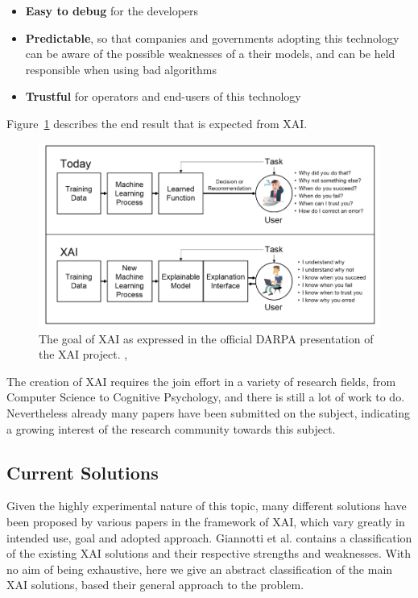 \documentclass[conference]{IEEEtran}
\newcommand{\cit}[1][]{\todo[tickmarkheight=0.2cm]{cit #1}}
\begin{document}
\begin{itemize}
    \item \textbf{Easy to debug} for the developers
    \item \textbf{Predictable}, so that companies and governments adopting this
          technology can be aware of the possible weaknesses of a their models,
          and can be held responsible when using bad algorithms
    \item \textbf{Trustful} for operators and end-users of this technology
\end{itemize}

Figure~\ref{fig:xai} describes the end result that is expected from XAI.


\begin{figure}[h!] \includegraphics[width=\linewidth]{images/xai.png}
    \caption{The goal of XAI as expressed in the official DARPA presentation of the XAI project. ,} \label{fig:xai} \end{figure}

The creation of XAI requires the join effort in a variety of research fields,
from Computer Science to Cognitive Psychology, and there is still a lot of work
to do. Nevertheless already many papers have been submitted on the subject,
indicating a growing interest of the research community towards this subject.

\subsection{Current Solutions}
\label{sec:solutions}

Given the highly experimental nature of this topic, many different solutions
have been proposed by various papers in the framework of XAI, which vary greatly
in intended use, goal and adopted approach. Giannotti et al. \cit contains a classification of the existing XAI
solutions and their respective strengths and weaknesses. With no aim of being
exhaustive, here we give an abstract
classification of the main XAI solutions, based their general approach to the
problem.
\end{document}
